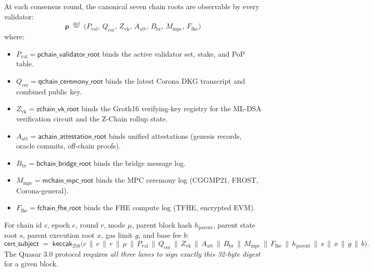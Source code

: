 \begin{definition}
\label{def:roots}
At each consensus round, the canonical seven chain roots are observable
by every validator:
\[
\boldsymbol{\rho} \;\stackrel{\text{def}}{=}\;
\bigl(P_\text{val},\, Q_\text{cer},\, Z_\text{vk},\, A_\text{att},\,
B_\text{br},\, M_\text{mpc},\, F_\text{fhe}\bigr)
\]
where:
\begin{itemize}[leftmargin=2em,nosep]
\item $P_\text{val} = \mathsf{pchain\_validator\_root}$ binds the active
      validator set, stake, and PoP table.
\item $Q_\text{cer} = \mathsf{qchain\_ceremony\_root}$ binds the latest
      Corona DKG transcript and combined public key.
\item $Z_\text{vk} = \mathsf{zchain\_vk\_root}$ binds the Groth16
      verifying-key registry for the ML-DSA verification circuit and the
      Z-Chain rollup state.
\item $A_\text{att} = \mathsf{achain\_attestation\_root}$ binds unified
      attestations (genesis records, oracle commits, off-chain proofs).
\item $B_\text{br} = \mathsf{bchain\_bridge\_root}$ binds the bridge
      message log.
\item $M_\text{mpc} = \mathsf{mchain\_mpc\_root}$ binds the MPC ceremony
      log (CGGMP21, FROST, Corona-general).
\item $F_\text{fhe} = \mathsf{fchain\_fhe\_root}$ binds the FHE compute
      log (TFHE, encrypted EVM).
\end{itemize}
\end{definition}

\begin{definition}
\label{def:subject}
For chain id $c$, epoch $e$, round $r$, mode $\mu$, parent block hash
$h_{\text{parent}}$, parent state root $s$, parent execution root $x$,
gas limit $g$, and base fee $b$:
\[
\mathsf{cert\_subject} \;=\; \mathsf{keccak}_{256}\!\bigl(
c \,\|\, e \,\|\, r \,\|\, \mu \,\|\,
P_\text{val} \,\|\, Q_\text{cer} \,\|\, Z_\text{vk} \,\|\,
A_\text{att} \,\|\, B_\text{br} \,\|\, M_\text{mpc} \,\|\,
F_\text{fhe} \,\|\, h_{\text{parent}} \,\|\, s \,\|\, x \,\|\,
g \,\|\, b \bigr).
\]
The Quasar 3.0 protocol requires \emph{all three lanes to sign exactly this
32-byte digest} for a given block.
\end{definition}

